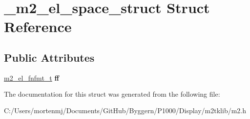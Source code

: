 \hypertarget{struct__m2__el__space__struct}{\section{\-\_\-m2\-\_\-el\-\_\-space\-\_\-struct Struct Reference}
\label{struct__m2__el__space__struct}
}
\subsection*{Public Attributes}
\begin{DoxyCompactItemize}
\item 
\hypertarget{struct__m2__el__space__struct_ad6128357db1ee1329cdad4bcabe84caa}{\hyperlink{struct__m2__el__fnfmt__struct}{m2\-\_\-el\-\_\-fnfmt\-\_\-t} {\bfseries ff}}\label{struct__m2__el__space__struct_ad6128357db1ee1329cdad4bcabe84caa}

\end{DoxyCompactItemize}


The documentation for this struct was generated from the following file\-:\begin{DoxyCompactItemize}
\item 
C\-:/\-Users/mortenmj/\-Documents/\-Git\-Hub/\-Byggern/\-P1000/\-Display/m2tklib/m2.\-h\end{DoxyCompactItemize}
